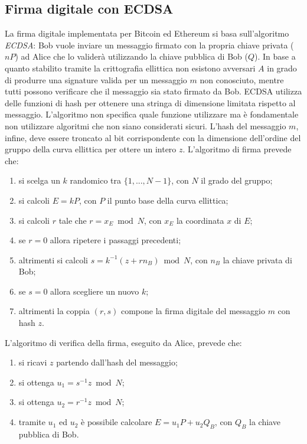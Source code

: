 \subsection{Firma digitale con ECDSA}

La firma digitale implementata per Bitcoin ed Ethereum si basa sull'algoritmo \textit{ECDSA}: Bob vuole inviare un messaggio firmato con la propria chiave privata ($nP$) ad Alice che lo validerà utilizzando la chiave pubblica di Bob ($Q$).\newline
In base a quanto stabilito tramite la crittografia ellittica non esistono avversari $A$ in grado di produrre una signature valida per un messaggio $m$ non conosciuto, mentre tutti possono verificare che il messaggio sia stato firmato da Bob.\newline\newline
ECDSA utilizza delle funzioni di hash per ottenere una stringa di dimensione limitata rispetto al messaggio. L'algoritmo non specifica quale funzione utilizzare ma è fondamentale non utilizzare algoritmi che non siano considerati sicuri.\newline
L'hash del messaggio $m$, infine, deve essere troncato al bit corrispondente con la dimensione dell'ordine del gruppo della curva ellittica per ottere un intero $z$. L'algoritmo di firma prevede che:

\begin{enumerate}
    \item si scelga un $k$ randomico tra $\{1,...,N-1\}$, con $N$ il grado del gruppo;
    \item si calcoli $E=kP$, con $P$ il punto base della curva ellittica;
    \item si calcoli $r$ tale che $r=x_E \bmod N$, con $x_E$ la coordinata $x$ di $E$;
    \item se $r=0$ allora ripetere i passaggi precedenti;
    \item altrimenti si calcoli $s=k^{-1}(z+rn_B)\bmod N$, con $n_B$ la chiave privata di Bob;
    \item se $s=0$ allora scegliere un nuovo $k$;
    \item altrimenti la coppia $(r,s)$ compone la firma digitale del messaggio $m$ con hash $z$.
\end{enumerate}

L'algoritmo di verifica della firma, eseguito da Alice, prevede che:

\begin{enumerate}
    \item si ricavi $z$ partendo dall'hash del messaggio;
    \item si ottenga $u_1=s^{-1}z\bmod N$;
    \item si ottenga $u_2=r^{-1}z\bmod N$;
    \item tramite $u_1$ ed $u_2$ è possibile calcolare $E=u_1P+u_2Q_B$, con $Q_B$ la chiave pubblica di Bob.
\end{enumerate}

